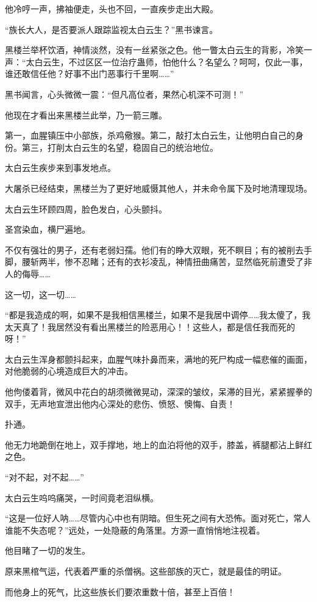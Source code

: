 \begin{this_body}
他冷哼一声，拂袖便走，头也不回，一直疾步走出大殿。

“族长大人，是否要派人跟踪监视太白云生？”黑书谏言。

黑楼兰举杯饮酒，神情淡然，没有一丝紧张之色。他一瞥太白云生的背影，冷笑一声：“太白云生，不过区区一位治疗蛊师，怕他什么？名望么？呵呵，仅此一事，谁还敢信任他？好事不出门恶事行千里啊……”

黑书闻言，心头微微一震：“但凡高位者，果然心机深不可测！”

他现在才看出来黑楼兰此举，乃一箭三雕。

第一，血腥镇压中小部族，杀鸡儆猴。第二，敲打太白云生，让他明白自己的身份。第三，打削太白云生的名望，稳固自己的统治地位。

太白云生疾步来到事发地点。

大屠杀已经结束，黑楼兰为了更好地威慑其他人，并未命令属下及时地清理现场。

太白云生环顾四周，脸色发白，心头颤抖。

圣宫染血，横尸遍地。

不仅有强壮的男子，还有老弱妇孺。他们有的睁大双眼，死不瞑目；有的被削去手脚，腰斩两半，惨不忍睹；还有的衣衫凌乱，神情扭曲痛苦，显然临死前遭受了非人的侮辱……

这一切，这一切……

“都是我造成的啊，如果不是我相信黑楼兰，如果不是我居中调停……我太傻了，我太天真了！我居然没有看出黑楼兰的险恶用心！！这些人，都是信任我而死的呀！”

太白云生浑身都颤抖起来，血腥气味扑鼻而来，满地的死尸构成一幅悲催的画面，对他脆弱的心境造成巨大的冲击。

他佝偻着背，微风中花白的胡须微微晃动，深深的皱纹，呆滞的目光，紧紧握拳的双手，无声地宣泄出他内心深处的悲伤、愤怒、懊悔、自责！

扑通。

他无力地跪倒在地上，双手撑地，地上的血泊将他的双手，膝盖，裤腿都沾上鲜红之色。

“对不起，对不起……”

太白云生呜呜痛哭，一时间竟老泪纵横。

“这是一位好人呐……尽管内心中也有阴暗。但生死之间有大恐怖。面对死亡，常人谁能不失态呢？”远处，一处隐蔽的角落里。方源一直悄悄地注视着。

他目睹了一切的发生。

原来黑棺气运，代表着严重的杀僧祸。这些部族的灭亡，就是最佳的明证。

而他身上的死气，比这些族长们要浓重数十倍，甚至上百倍！


\end{this_body}

